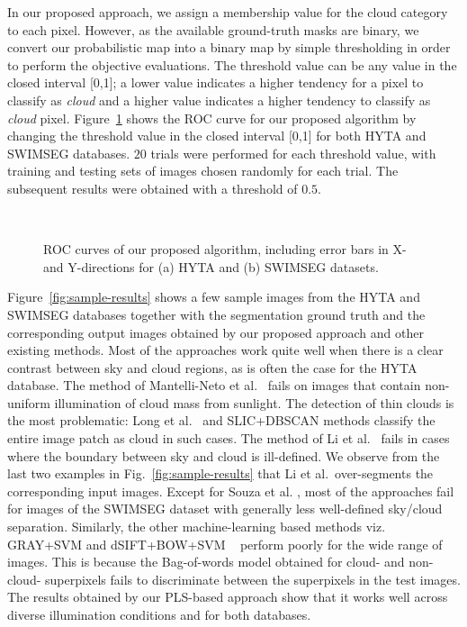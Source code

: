In our proposed approach, we assign a membership value for the cloud category to each pixel. However, as the available ground-truth masks are binary, we convert our probabilistic map into a binary map by simple thresholding in order to perform the objective evaluations.
The threshold value can be any value in the closed interval [0,1]; a lower value indicates a higher tendency for a pixel to classify as \emph{cloud} and a higher value indicates a higher tendency to classify as \emph{cloud} pixel. Figure~\ref{fig:ROC-prop} shows the ROC curve for our proposed algorithm by changing the threshold value in the closed interval [0,1] for both HYTA and SWIMSEG databases.  $20$ trials were performed for each threshold value, with training and testing sets of images chosen randomly for each trial. The subsequent results were obtained with a threshold of $0.5$.

\begin{figure}[H]
\centering
{}\\
\caption[ROC curves of our proposed segmentation approach for HYTA and SWIMSEG databases.]{ROC curves of our proposed algorithm, including error bars in X- and Y-directions for (a) HYTA and (b) SWIMSEG datasets.}
\label{fig:ROC-prop}
\end{figure}

Figure~\ref{fig:sample-results} shows a few sample images from the HYTA and SWIMSEG databases together with the segmentation ground truth and the corresponding output images obtained by our proposed approach and other existing methods.  Most of the approaches work quite well when there is a clear contrast between sky and cloud regions, as is often the case for the HYTA database. The method of Mantelli-Neto et al.\ \cite{Sylvio} fails on images that contain non-uniform illumination of cloud mass from sunlight. The detection of thin clouds is  the most problematic: Long et al.\ \cite{Long} and SLIC+DBSCAN methods classify the entire image patch as cloud in such cases. The method of Li et al.\ \cite{Li2011} fails in cases where the boundary between sky and cloud is ill-defined. We observe from the last two examples in Fig.~\ref{fig:sample-results} that Li et al.\ over-segments the corresponding input images. Except for Souza et al. \cite{Souza}, most of the approaches fail for images of the SWIMSEG dataset with generally less well-defined sky/cloud separation. 
Similarly, the other machine-learning based methods viz. GRAY+SVM and dSIFT+BOW+SVM ~\cite{BOW-cloud} perform poorly for the wide range of images. This is because the Bag-of-words model obtained for cloud- and non-cloud- superpixels fails to discriminate between the superpixels in the test images.
The results obtained by our PLS-based approach show that it works well across diverse illumination conditions and for both databases. 

